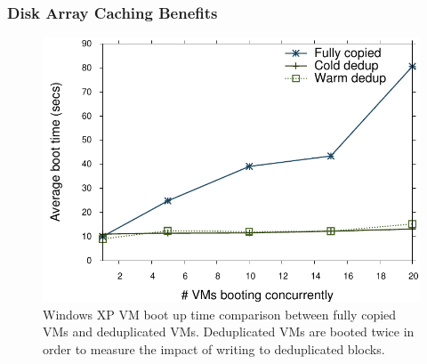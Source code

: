 \subsubsection{Disk Array Caching Benefits}


\begin{figure}
\centering
\includegraphics[scale=0.6]{figures/copied-vs-dedup.pdf}
\caption{Windows XP VM boot up time comparison between fully
  copied VMs and deduplicated VMs.  Deduplicated VMs are booted twice
  in order to measure the impact of writing to deduplicated blocks.}
\label{fig:copied-vs-dedup}
\end{figure}


